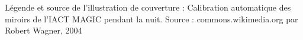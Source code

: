 \thispagestyle{empty}
\vspace*{500pt} %
Légende et source de l'illustration de couverture :
Calibration automatique des miroirs de l’IACT MAGIC pendant la nuit. 
Source : commons.wikimedia.org par Robert Wagner, 2004 
